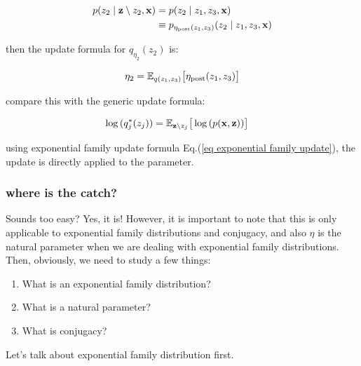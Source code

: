 \documentclass{article}
\def\post{\text{post}}
\begin{document}
\begin{equation}\begin{split}
p(z_2 \; | \; \z \setminus z_2 , \x )
&= p(z_2 \; | \; z_1, z_3, \x )\\
&\equiv p_{\eta_\post (z_1, z_3 )}(z_2 \; | \; z_1, z_3, \x )
\end{split}\end{equation}

then the update formula for $q_{\eta_2}(z_2)$ is:

\begin{equation}\begin{split}
\eta_2 =  \E_{q(z_1, z_3)} \big[ \eta_\post (z_1, z_3 ) \big]
\end{split}\end{equation}

\vspace{2mm}
compare this with the generic update formula:

\begin{equation}\begin{split}
\log{ ( q_{j}^*(z_j)) } &= \mathbb{E}_{{\mathbf z} \setminus z_j} \big[ \log{(p({\mathbf x},{\mathbf z}))} \big]
\end{split}\end{equation}

using exponential family update formula Eq.(\ref{eq exponential family update}), the update is directly applied to the parameter. 

\subsubsection{where is the catch?}

Sounds too easy? Yes, it is! However, it is important to note that this is only applicable to exponential family distributions and conjugacy, and also $\eta$ is the natural parameter when we are dealing with exponential family distributions. Then, obviously, we need to study a few things:

\begin{enumerate}
\item What is an exponential family distribution?
\item What is a natural parameter?
\item What is conjugacy?
\end{enumerate}

Let's talk about exponential family distribution first.

\end{document}
